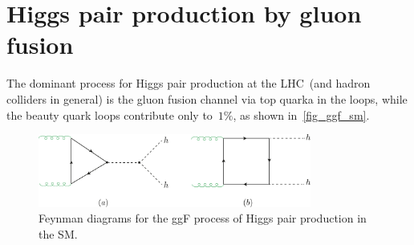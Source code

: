 \section{Higgs pair production by gluon fusion \label{ggFhh}  }
The dominant process for Higgs pair production at the LHC~(and hadron colliders in general) is the gluon fusion channel via top quarka in the loops, while the beauty quark loops contribute only to~$1\%$, as shown in~\autoref{fig_ggf_sm}.
%
\begin{figure}[!htpb]
	\centering
	\includegraphics[width = 0.8\textwidth]{./figures/di-higgs-LO-SM}
	\caption{Feynman diagrams for the ggF process of Higgs pair production in the SM.} 
	\label{fig_ggf_sm}
\end{figure}
%
